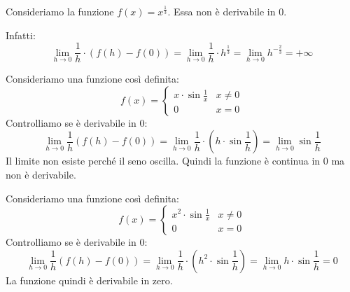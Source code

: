 \begin{example}
Consideriamo la funzione $f(x) = x^{\frac{1}{3}}$. Essa non è derivabile in 0.

\begin{center}
\end{center}

Infatti:
\begin{equation*}
\lim_{h \to 0} \frac{1}{h} \cdot (f(h)-f(0)) = \lim_{h \to 0} \frac{1}{h} \cdot h^{\frac{1}{3}} = \lim_{h \to 0} h^{-\frac{2}{3}} = +\infty
\end{equation*}
\end{example}

\begin{example}
Consideriamo una funzione così definita:
\begin{equation*}
f(x) = \begin{cases}
x \cdot \sin \frac{1}{x} & x \neq 0 \\
0 & x = 0
\end{cases}
\end{equation*}
Controlliamo se è derivabile in 0:
\begin{equation*}
\lim_{h \to 0} \frac{1}{h} (f(h)-f(0)) = \lim_{h \to 0} \frac{1}{h} \cdot \left(h \cdot \sin \frac{1}{h} \right) = \lim_{h \to 0} \sin \frac{1}{h}
\end{equation*}
Il limite non esiste perché il seno oscilla. Quindi la funzione è continua in 0 ma non è derivabile.
\end{example}

\begin{example}
Consideriamo una funzione così definita:
\begin{equation*}
f(x) = \begin{cases}
x^2 \cdot \sin \frac{1}{x} & x \neq 0 \\
0 & x = 0
\end{cases}
\end{equation*}
Controlliamo se è derivabile in 0:
\begin{equation*}
\lim_{h \to 0} \frac{1}{h} (f(h)-f(0)) = \lim_{h \to 0} \frac{1}{h} \cdot \left(h^2 \cdot \sin \frac{1}{h} \right) = \lim_{h \to 0} h \cdot \sin \frac{1}{h} = 0
\end{equation*}
La funzione quindi è derivabile in zero.
\end{example}

